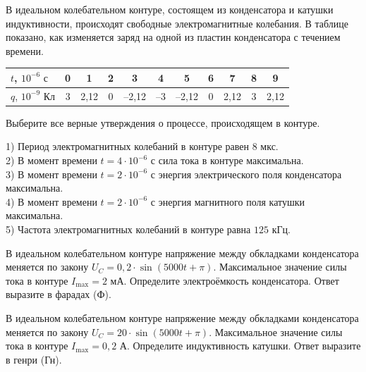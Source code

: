 \begin{taskbasic}[code={\label{task:elem_osc_v26_n14}}]
В идеальном колебательном контуре, состоящем из конденсатора и катушки индуктивности, происходят свободные электромагнитные колебания. В таблице показано, как изменяется заряд на одной из пластин конденсатора с течением времени.

\nopagebreak\smallskip
\begin{center}
\small
\begin{tabular}{|l|c|c|c|c|c|c|c|c|c|c|}
\hline
$t$, $10^{-6}\text{ с}$ & 0 & 1 & 2 & 3 & 4 & 5 & 6 & 7 & 8 & 9 \\ \hline
$q$, $10^{-9}\text{ Кл}$ & 3 & 2,12 & 0 & --2,12 & --3 & --2,12 & 0 & 2,12 & 3 & 2,12 \\ \hline
\end{tabular}
\end{center}
\smallskip

Выберите все верные утверждения о процессе, происходящем в контуре.

1) Период электромагнитных колебаний в контуре равен $8\text{ мкс}$.\\
2) В момент времени $t = 4\cdot 10^{-6}\text{ с}$ сила тока в контуре максимальна.\\
3) В момент времени $t = 2\cdot 10^{-6}\text{ с}$ энергия электрического поля конденсатора максимальна.\\
4) В момент времени $t = 2\cdot 10^{-6}\text{ с}$ энергия магнитного поля катушки максимальна.\\
5) Частота электромагнитных колебаний в контуре равна $125\text{ кГц}$.

\end{taskbasic}

\begin{taskbasic}[code={\label{task:elem_osc_v21_n23}}]
В идеальном колебательном контуре напряжение между обкладками конденсатора меняется по закону $U_C = 0{,}2 \cdot \sin(5000t + \pi)$. Максимальное значение силы тока в контуре $I_{\max} = 2\text{ мА}$. Определите электроёмкость конденсатора. Ответ выразите в фарадах (Ф).

\end{taskbasic}

\begin{taskbasic}[code={\label{task:elem_osc_v22_n23}}]
В идеальном колебательном контуре напряжение между обкладками конденсатора меняется по закону $U_C = 20 \cdot \sin(5000t + \pi)$. Максимальное значение силы тока в контуре $I_{\max} = 0{,}2\text{ А}$. Определите индуктивность катушки. Ответ выразите в генри (Гн).

\end{taskbasic}


